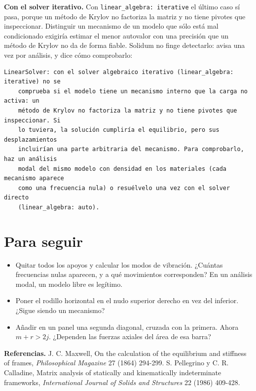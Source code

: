 \documentclass[11pt,oneside]{report}
\begin{document}
\textbf{Con el solver iterativo.} Con \texttt{linear\_\allowbreak{}algebra: iterative} el último caso sí pasa, porque un método de Krylov no factoriza la matriz y no tiene pivotes que inspeccionar. Distinguir un mecanismo de un modelo que sólo está mal condicionado exigiría estimar el menor autovalor con una precisión que un método de Krylov no da de forma fiable. Solidum no finge detectarlo: avisa una vez por análisis, y dice cómo comprobarlo:

\begin{lstlisting}
LinearSolver: con el solver algebraico iterativo (linear_algebra: iterative) no se
    comprueba si el modelo tiene un mecanismo interno que la carga no activa: un
    método de Krylov no factoriza la matriz y no tiene pivotes que inspeccionar. Si
    lo tuviera, la solución cumpliría el equilibrio, pero sus desplazamientos
    incluirían una parte arbitraria del mecanismo. Para comprobarlo, haz un análisis
    modal del mismo modelo con densidad en los materiales (cada mecanismo aparece
    como una frecuencia nula) o resuélvelo una vez con el solver directo
    (linear_algebra: auto).

\end{lstlisting}

\section{Para seguir}

\begin{itemize}
  \item Quitar todos los apoyos y calcular los modos de vibración. ¿Cuántas frecuencias nulas aparecen, y a qué movimientos corresponden? En un análisis modal, un modelo libre es legítimo.
  \item Poner el rodillo horizontal en el nudo superior derecho en vez del inferior. ¿Sigue siendo un mecanismo?
  \item Añadir en un panel una segunda diagonal, cruzada con la primera. Ahora $m + r > 2j$. ¿Dependen las fuerzas axiales del área de esa barra?
\end{itemize}

\textbf{Referencias.} J. C. Maxwell, \textquotedbl{}On the calculation of the equilibrium and stiffness of frames\textquotedbl{}, \textit{Philosophical Magazine} 27 (1864) 294-299. S. Pellegrino y C. R. Calladine, \textquotedbl{}Matrix analysis of statically and kinematically indeterminate frameworks\textquotedbl{}, \textit{International Journal of Solids and Structures} 22 (1986) 409-428.
\end{document}
